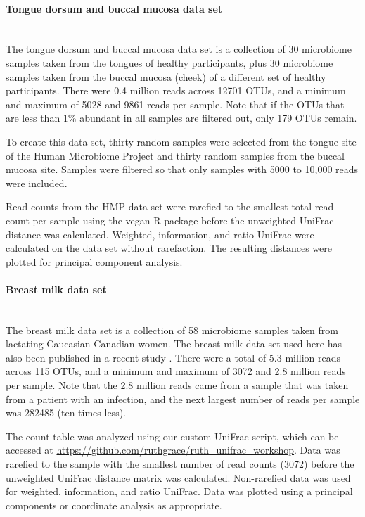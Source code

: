 \documentclass[10pt,letterpaper]{article}
\begin{document}
\paragraph{Tongue dorsum and buccal mucosa data set}\mbox{}\\
The tongue dorsum and buccal mucosa data set is a collection of 30 microbiome samples taken from the tongues of healthy participants, plus 30 microbiome samples taken from the buccal mucosa (cheek) of a different set of healthy participants. There were 0.4 million reads across 12701 OTUs, and a minimum and maximum of 5028 and 9861 reads per sample. Note that if the OTUs that are less than 1\% abundant in all samples are filtered out, only 179 OTUs remain.

To create this data set, thirty random samples were selected from the tongue site of the Human Microbiome Project \cite{turnbaugh2007human} and thirty random samples from the buccal mucosa site. Samples were filtered so that only samples with 5000 to 10,000 reads were included.

Read counts from the HMP data set were rarefied to the smallest total read count per sample using the vegan R package \cite{oksanen2007vegan} before the unweighted UniFrac distance was calculated. Weighted, information, and ratio UniFrac were calculated on the data set without rarefaction. The resulting distances were plotted for principal component analysis.

\paragraph{Breast milk data set}\mbox{}\\
The breast milk data set is a collection of 58 microbiome samples taken from lactating Caucasian Canadian women. The breast milk data set used here has also been published in a recent study \cite{urbaniak2016human}. There were a total of 5.3 million reads across 115 OTUs, and a minimum and maximum of 3072 and 2.8 million reads per sample. Note that the 2.8 million reads came from a sample that was taken from a patient with an infection, and the next largest number of reads per sample was 282485 (ten times less).

The count table was analyzed using our custom UniFrac script, which can be accessed at \url{https://github.com/ruthgrace/ruth_unifrac_workshop}. Data was rarefied to the sample with the smallest number of read counts (3072) before the unweighted UniFrac distance matrix was calculated. Non-rarefied data was used for weighted, information, and ratio UniFrac. Data was plotted using a principal components or coordinate analysis as appropriate.
\end{document}
